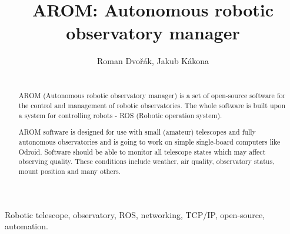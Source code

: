 \documentclass{ibws_template}
\begin{document}

%
\title{AROM: Autonomous robotic observatory manager}
%

%
\author{Roman Dvořák, Jakub Kákona }
%


\maketitle


\begin{abstract}\\
AROM (Autonomous robotic observatory manager) is a set of open-source software for the control and management of robotic observatories. The whole software is built upon a system for controlling robots - ROS (Robotic operation system).

AROM software is designed for use with small (amateur) telescopes and fully autonomous observatories and is going to work on simple single-board computers like Odroid. Software should be able to monitor all telescope states which may affect observing quality. These conditions include weather, air quality, observatory status, mount position and many others.
\end{abstract}


\begin{keywords}
Robotic telescope, observatory, ROS, networking, TCP/IP, open-source, automation.
\end{keywords}
\end{document}
